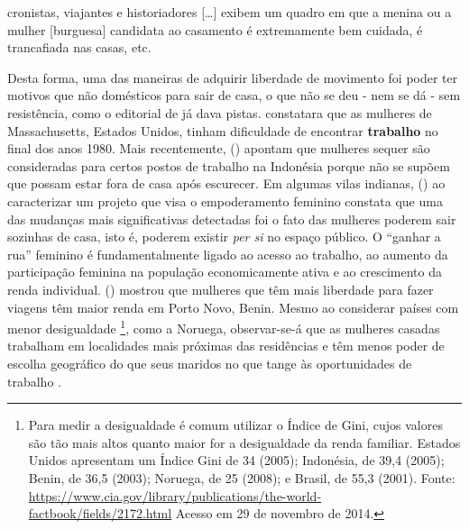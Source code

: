 \begin{citacao}
cronistas, viajantes e historiadores [\ldots] exibem um quadro em que a menina ou a mulher [burguesa] candidata ao casamento é extremamente bem cuidada, é trancafiada nas casas, etc.
\end{citacao}




Desta forma, uma das maneiras de adquirir liberdade de movimento foi poder ter motivos que não domésticos para sair de casa, o que não se deu - nem se dá - sem resistência, como o editorial de  já dava pistas.  constatara que as mulheres de Massachusetts, Estados Unidos, tinham dificuldade de encontrar \textbf{trabalho} no final dos anos 1980.
Mais recentemente, 
 (\citeyear{ELMHIRST2003}) apontam que mulheres sequer são consideradas para certos postos de trabalho na Indonésia porque não se supõem que possam estar fora de casa após escurecer. Em algumas vilas indianas,  (\citeyear{RAJU2005}) ao caracterizar um projeto que visa o empoderamento feminino constata que uma das mudanças mais significativas detectadas foi o fato das mulheres poderem sair sozinhas de casa, isto é, poderem existir \emph{per si} no espaço público.
O ``ganhar a rua'' feminino é fundamentalmente ligado ao acesso ao trabalho, ao aumento da participação feminina na população economicamente ativa  e ao crescimento da renda individual.   (\citeyear{MANDEL2004}) mostrou que mulheres que têm mais liberdade para fazer viagens têm maior renda em Porto Novo, Benin.
Mesmo ao considerar países com menor desigualdade%
\footnote{Para medir a desigualdade é comum utilizar o Índice de Gini, cujos valores são tão mais altos quanto maior for a desigualdade da renda familiar. Estados Unidos apresentam um Índice Gini de 34 (2005); Indonésia, de 39,4 (2005); Benin, de 36,5 (2003); Noruega, de 25 (2008); e Brasil, de 55,3 (2001). Fonte: \url{https://www.cia.gov/library/publications/the-world-factbook/fields/2172.html} Acesso em 29 de novembro de 2014.}, como a Noruega, observar-se-á que as mulheres casadas trabalham em localidades mais próximas das residências e têm menos poder de escolha geográfico do que seus maridos no que tange às oportunidades de trabalho \cite{HJORTHOL2000}.

